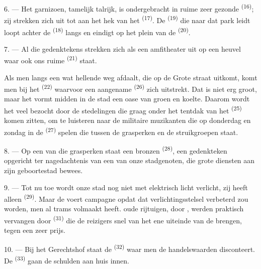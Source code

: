 \VUsaut{5.0mm}
\VUsaut{3.4mm}

6. --- Het garnizoen, tamelijk talrijk, is ondergebracht in ruime zeer gezonde
 \textsuperscript{(16)}; zij strekken zich uit tot aan het hek
van het  \textsuperscript{(17)}. De 
\textsuperscript{(19)} die naar dat park leidt loopt achter de
 \textsuperscript{(18)} langs en eindigt op het plein van de
 \textsuperscript{(20)}.

7. --- Al die gedenktekens strekken zich als een amfitheater uit op een heuvel waar ook ons
ruime  \textsuperscript{(21)} staat.

Als men langs een wat hellende weg afdaalt, die op de Grote straat uitkomt, komt men bij het
 \textsuperscript{(22)} waarvoor een aangename
 \textsuperscript{(26)} zich uitstrekt. Dat
 is niet erg groot, maar het vormt midden in de stad een oase
van groen en koelte. Daarom wordt het veel bezocht door de stedelingen die graag onder het
tentdak van het  \textsuperscript{(25)} komen zitten, om te luisteren naar de
militaire muzikanten die op donderdag en zondag in de
 \textsuperscript{(27)} spelen die tussen de grasperken en de
struikgroepen staat.

8. --- Op een van die grasperken staat een bronzen  \textsuperscript{(28)},
een gedenkteken opgericht ter nagedachtenis van een van onze stadgenoten, die grote diensten
aan zijn geboortestad bewees.

\VUsaut{4.0mm}
\VUsaut{3.4mm}

9. --- Tot nu toe wordt onze stad nog niet met elektrisch licht verlicht, zij heeft alleen
 \textsuperscript{(29)}. Maar de
 voert campagne opdat dat verlichtingsstelsel verbeterd
zou worden,  men al  trams volmaakt heeft.
 oude rijtuigen,  door
, werden praktisch vervangen door 
\textsuperscript{(31)} die de reizigers snel van het ene uiteinde van de
 brengen, tegen een zeer  prijs.

10. --- Bij het Gerechtshof staat de  \textsuperscript{(32)} waar men de
handelswaarden disconteert. De  \textsuperscript{(33)} gaan de schulden
aan huis innen.

